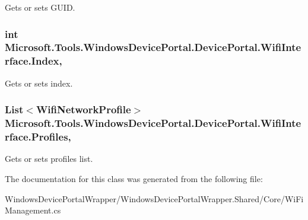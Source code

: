Gets or sets G\+U\+ID. 

\subsubsection[{\texorpdfstring{Index}{Index}}]{\setlength{\rightskip}{0pt plus 5cm}int Microsoft.\+Tools.\+Windows\+Device\+Portal.\+Device\+Portal.\+Wifi\+Interface.\+Index\hspace{0.3cm}{\ttfamily [get]}, {\ttfamily [set]}}\hypertarget{class_microsoft_1_1_tools_1_1_windows_device_portal_1_1_device_portal_1_1_wifi_interface_a19d5b350fb08c75858a36c3f96421da5}{}\label{class_microsoft_1_1_tools_1_1_windows_device_portal_1_1_device_portal_1_1_wifi_interface_a19d5b350fb08c75858a36c3f96421da5}


Gets or sets index. 

\subsubsection[{\texorpdfstring{Profiles}{Profiles}}]{\setlength{\rightskip}{0pt plus 5cm}List$<${\bf Wifi\+Network\+Profile}$>$ Microsoft.\+Tools.\+Windows\+Device\+Portal.\+Device\+Portal.\+Wifi\+Interface.\+Profiles\hspace{0.3cm}{\ttfamily [get]}, {\ttfamily [set]}}\hypertarget{class_microsoft_1_1_tools_1_1_windows_device_portal_1_1_device_portal_1_1_wifi_interface_a107df203b135714dfe64a924edbe4f54}{}\label{class_microsoft_1_1_tools_1_1_windows_device_portal_1_1_device_portal_1_1_wifi_interface_a107df203b135714dfe64a924edbe4f54}


Gets or sets profiles list. 



The documentation for this class was generated from the following file\+:\begin{DoxyCompactItemize}
\item 
Windows\+Device\+Portal\+Wrapper/\+Windows\+Device\+Portal\+Wrapper.\+Shared/\+Core/Wi\+Fi\+Management.\+cs\end{DoxyCompactItemize}
